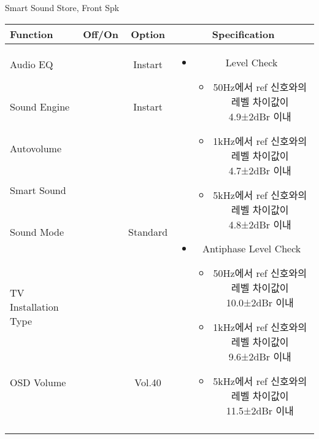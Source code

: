 \begin{frame}[t]{Smart Sound Store, Front Spk}
\begin{tiny}
\begin{tabular}{@{}lccc@{}}
\toprule
Function & Off/On & Option & Specification \\
\midrule
Audio EQ & \color{black}{Off} & Instart &
\multirow{10}{60mm}{
\begin{itemize}
	\item Level Check
	\begin{itemize}
		\item 50Hz에서 ref 신호와의 레벨 차이값이 4.9±2dBr 이내
		\item 1kHz에서 ref 신호와의 레벨 차이값이 4.7±2dBr 이내
		\item 5kHz에서 ref 신호와의 레벨 차이값이 4.8±2dBr 이내
	\end{itemize}
	\item Antiphase Level Check
	\begin{itemize}
		\item 50Hz에서 ref 신호와의 레벨 차이값이 10.0±2dBr 이내
		\item 1kHz에서 ref 신호와의 레벨 차이값이 9.6±2dBr 이내
		\item 5kHz에서 ref 신호와의 레벨 차이값이 11.5±2dBr 이내
	\end{itemize}
\end{itemize}
} \\
Sound Engine & \color{blue}{On} & Instart & \\
Autovolume & \color{black}{Off} & & \\
Smart Sound & \color{blue}{On} & & \\
Sound Mode & \color{blue}{On} & Standard & \\
TV Installation Type & \color{blue}{On} & \color{black}{Standtype1} & \\
OSD Volume & \color{blue}{On} & Vol.40 & \\
& & & \\
& & & \\
& & & \\
& & & \\
\midrule
\end{tabular}
\end{tiny}

\end{frame}



